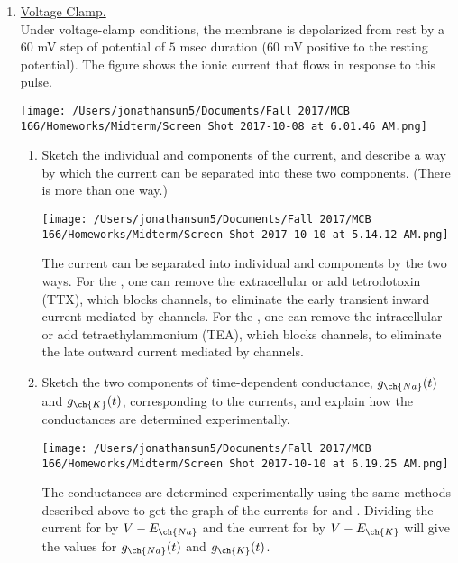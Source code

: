 \documentclass[11pt]{article}
\begin{document}
\begin{enumerate}[label=\arabic*.]
\newpage
\item
\underline{Voltage Clamp.}
\vspace*{1\baselineskip}
\\
Under voltage-clamp conditions, the membrane is depolarized from rest by a $60$ mV step of potential of $5$ msec duration ($60$ mV positive to the resting potential). The figure shows the ionic current that flows in response to this pulse.
\begin{center}
\texttt{[image: /Users/jonathansun5/Documents/Fall 2017/MCB 166/Homeworks/Midterm/Screen Shot 2017-10-08 at 6.01.46 AM.png]}
\end{center}
\begin{enumerate}[label=(\alph*)]
\item
Sketch the individual  and  components of the current, and describe a way by which the current can be separated into these two components. (There is more than one way.)
\begin{center}
\texttt{[image: /Users/jonathansun5/Documents/Fall 2017/MCB 166/Homeworks/Midterm/Screen Shot 2017-10-10 at 5.14.12 AM.png]}
\end{center}
The current can be separated into individual  and  components by the two ways. For the , one can remove the extracellular  or add tetrodotoxin (TTX), which blocks  channels, to eliminate the early transient inward current mediated by  channels. For the , one can remove the intracellular  or add tetraethylammonium (TEA), which blocks  channels, to eliminate the late outward current mediated by  channels.



\newpage
\item
Sketch the two components of time-dependent conductance, $g_{\ch{Na}}(t)$ and $g_{\ch{K}}(t)$, corresponding to the currents, and explain how the conductances are determined experimentally.
\begin{center}
\texttt{[image: /Users/jonathansun5/Documents/Fall 2017/MCB 166/Homeworks/Midterm/Screen Shot 2017-10-10 at 6.19.25 AM.png]}
\end{center}
The conductances are determined experimentally using the same methods described above to get the graph of the currents for  and . Dividing the current for  by $V - E_{\ch{Na}}$ and the current for  by $V - E_{\ch{K}}$ will give the values for $g_{\ch{Na}}(t)$ and $g_{\ch{K}}(t)$.




\end{enumerate}
\end{enumerate}
\end{document}
